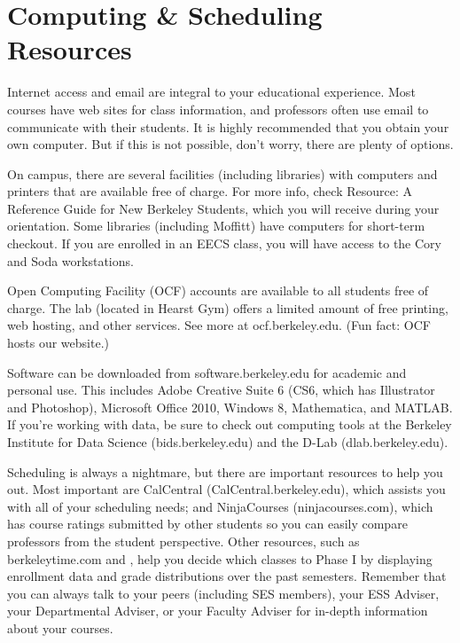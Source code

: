 \chapter*{Computing \& Scheduling Resources}

Internet access and email are integral to your educational experience. Most courses have web sites for class information, and professors often use email to communicate with their students. It is highly recommended that you obtain your own computer. But if this is not possible, don’t worry, there are plenty of options.

On campus, there are several facilities (including libraries) with computers and printers that are available free of charge. For more info, check Resource: A Reference Guide for New Berkeley Students, which you will receive during your orientation. Some libraries (including Moffitt) have computers for short-term checkout. If you are enrolled in an EECS class, you will have access to the Cory and Soda workstations.

Open Computing Facility (OCF) accounts are available to all students free of charge. The lab (located in Hearst Gym) offers a limited amount of free printing, web hosting, and other services. See more at {\selectfont ocf.berkeley.edu}. (Fun fact: OCF hosts our website.)

Software can be downloaded from {\selectfont software.berkeley.edu} for academic and personal use. This includes Adobe Creative Suite 6 (CS6, which has Illustrator and Photoshop), Microsoft Office 2010, Windows 8, Mathematica, and MATLAB. If you’re working with data, be sure to check out computing tools at the Berkeley Institute for Data Science ({\selectfont bids.berkeley.edu}) and the D-Lab ({\selectfont dlab.berkeley.edu}).

Scheduling is always a nightmare, but there are important resources to help you out. Most important are CalCentral ({\selectfont CalCentral.berkeley.edu}), which assists you with all of your scheduling needs; and NinjaCourses ({\selectfont ninjacourses.com}), which has course ratings submitted by other students so you can easily compare professors from the student perspective. Other resources, such as {\selectfont berkeleytime.com} and {\selectfont {}}, help you decide which classes to Phase I by displaying enrollment data and grade distributions over the past semesters. Remember that you can always talk to your peers (including SES members), your ESS Adviser, your Departmental Adviser, or your Faculty Adviser for in-depth information about your courses.

